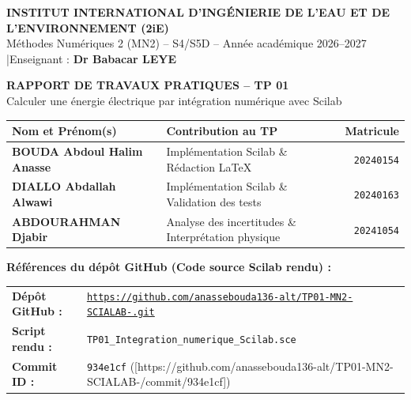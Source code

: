 \documentclass[10pt,a4paper]{article}
\begin{document}
\begin{center}
    {\Large\bfseries\color{primary} INSTITUT INTERNATIONAL D'INGÉNIERIE DE L'EAU ET DE L'ENVIRONNEMENT (2iE)}\\[2pt]
    {\normalsize Méthodes Numériques 2 (MN2) -- S4/S5D -- Année académique 2026--2027 \quad|\quad Enseignant : \textbf{Dr Babacar LEYE}}\\[6pt]
    
    \colorbox{primary}{%
        \parbox{\dimexpr\textwidth-2\fboxsep\relax}{%
            \centering\vspace{5pt}
            {\Large\bfseries\color{white} RAPPORT DE TRAVAUX PRATIQUES -- TP 01}\\[2pt]
            {\normalsize\color{white} Calculer une énergie électrique par intégration numérique avec Scilab}
            \vspace{5pt}
        }%
    }
\end{center}

\vspace{2pt}

\begin{tabularx}{\textwidth}{@{}l >{\raggedright\arraybackslash}X r@{}}
\toprule
\textbf{Nom et Prénom(s)} & \textbf{Contribution au TP} & \textbf{Matricule} \\
\midrule
\textbf{BOUDA Abdoul Halim Anasse} & Implémentation Scilab \& Rédaction LaTeX & \texttt{20240154} \\
\textbf{DIALLO Abdallah Alwawi} & Implémentation Scilab \& Validation des tests & \texttt{20240163} \\
\textbf{ABDOURAHMAN Djabir} & Analyse des incertitudes \& Interprétation physique & \texttt{20241054} \\
\bottomrule
\end{tabularx}

\vspace{3pt}

\noindent\colorbox{secondary!8}{%
  \parbox{\dimexpr\textwidth-2\fboxsep\relax}{%
    \vspace{3pt}
    \textbf{\color{secondary}Références du dépôt GitHub (Code source Scilab rendu) :}\\[2pt]
    \begin{tabularx}{\linewidth}{@{}l >{\raggedright\arraybackslash}X@{}}
      \textbf{Dépôt GitHub :} & \texttt{\url{https://github.com/anassebouda136-alt/TP01-MN2-SCIALAB-.git}} \\
      \textbf{Script rendu :} & \texttt{TP01\_Integration\_numerique\_Scilab.sce} \\
      \textbf{Commit ID :} & \texttt{934e1cf} ([https://github.com/anassebouda136-alt/TP01-MN2-SCIALAB-/commit/934e1cf])
    \end{tabularx}
    \vspace{3pt}
  }%
}
\end{document}
